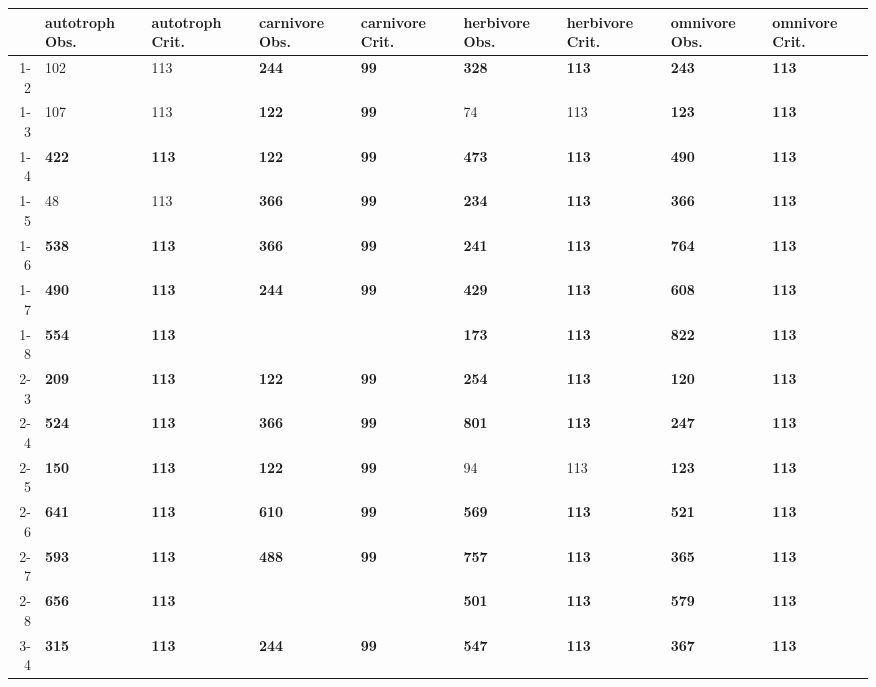 \begin{table}[ht]
\centering
\begin{tabular}{rllllllll}
  \toprule
 & autotroph Obs. & autotroph Crit. & carnivore Obs. & carnivore Crit. & herbivore Obs. & herbivore Crit. & omnivore Obs. & omnivore Crit. \\ 
  \midrule
1-2 & 102 & 113 & \textbf{244} & \textbf{99} & \textbf{328} & \textbf{113} & \textbf{243} & \textbf{113} \\ 
  1-3 & 107 & 113 & \textbf{122} & \textbf{99} & 74 & 113 & \textbf{123} & \textbf{113} \\ 
  1-4 & \textbf{422} & \textbf{113} & \textbf{122} & \textbf{99} & \textbf{473} & \textbf{113} & \textbf{490} & \textbf{113} \\ 
  1-5 & 48 & 113 & \textbf{366} & \textbf{99} & \textbf{234} & \textbf{113} & \textbf{366} & \textbf{113} \\ 
  1-6 & \textbf{538} & \textbf{113} & \textbf{366} & \textbf{99} & \textbf{241} & \textbf{113} & \textbf{764} & \textbf{113} \\ 
  1-7 & \textbf{490} & \textbf{113} & \textbf{244} & \textbf{99} & \textbf{429} & \textbf{113} & \textbf{608} & \textbf{113} \\ 
  1-8 & \textbf{554} & \textbf{113} &  &  & \textbf{173} & \textbf{113} & \textbf{822} & \textbf{113} \\ 
  2-3 & \textbf{209} & \textbf{113} & \textbf{122} & \textbf{99} & \textbf{254} & \textbf{113} & \textbf{120} & \textbf{113} \\ 
  2-4 & \textbf{524} & \textbf{113} & \textbf{366} & \textbf{99} & \textbf{801} & \textbf{113} & \textbf{247} & \textbf{113} \\ 
  2-5 & \textbf{150} & \textbf{113} & \textbf{122} & \textbf{99} & 94 & 113 & \textbf{123} & \textbf{113} \\ 
  2-6 & \textbf{641} & \textbf{113} & \textbf{610} & \textbf{99} & \textbf{569} & \textbf{113} & \textbf{521} & \textbf{113} \\ 
  2-7 & \textbf{593} & \textbf{113} & \textbf{488} & \textbf{99} & \textbf{757} & \textbf{113} & \textbf{365} & \textbf{113} \\ 
  2-8 & \textbf{656} & \textbf{113} &  &  & \textbf{501} & \textbf{113} & \textbf{579} & \textbf{113} \\ 
  3-4 & \textbf{315} & \textbf{113} & \textbf{244} & \textbf{99} & \textbf{547} & \textbf{113} & \textbf{367} & \textbf{113} \\ 

\end{tabular}
\end{table}
